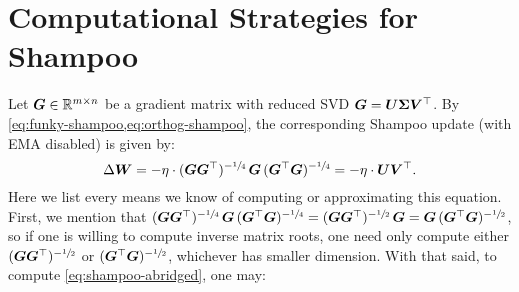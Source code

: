 \section{Computational Strategies for Shampoo}
\label{app:shampoo}

Let ${\bm{G}}\in\mathbb{R}^{m\times n}$ be a gradient matrix with reduced SVD ${\bm{G}} = {\bm{U}} {\bm{\Sigma}} {\bm{V}}^\top$. By \cref{eq:funky-shampoo,eq:orthog-shampoo}, the corresponding Shampoo update (with EMA disabled) is given by:
\begin{equation}\label{eq:shampoo-abridged}
    \Delta {\bm{W}} = - \eta \cdot ({\bm{G}}{\bm{G}}^\top)^{-\sfrac{1}{4}} \,{\bm{G}}\, ({\bm{G}}^\top{\bm{G}})^{-\sfrac{1}{4}} = - \eta \cdot {\bm{U}} {\bm{V}}^\top.
\end{equation}
Here we list every means we know of computing or approximating this equation. First, we mention that $({\bm{G}}{\bm{G}}^\top)^{-\sfrac{1}{4}} \,{\bm{G}}\, ({\bm{G}}^\top{\bm{G}})^{-\sfrac{1}{4}} = ({\bm{G}}{\bm{G}}^\top)^{-\sfrac{1}{2}} \,{\bm{G}} = {\bm{G}}\, ({\bm{G}}^\top{\bm{G}})^{-\sfrac{1}{2}}$, so if one is willing to compute inverse matrix roots, one need only compute either $({\bm{G}}{\bm{G}}^\top)^{-\sfrac{1}{2}}$ or $({\bm{G}}^\top{\bm{G}})^{-\sfrac{1}{2}}$, whichever has smaller dimension. With that said, to compute \cref{eq:shampoo-abridged}, one may:
